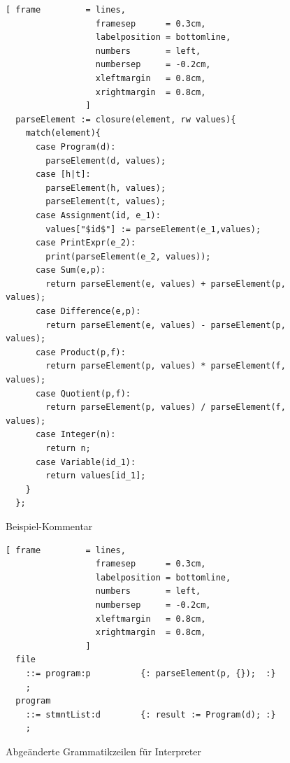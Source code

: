 \begin{figure}[!htb]

\begin{Verbatim}[ frame         = lines, 
                  framesep      = 0.3cm, 
                  labelposition = bottomline,
                  numbers       = left,
                  numbersep     = -0.2cm,
                  xleftmargin   = 0.8cm,
                  xrightmargin  = 0.8cm,
                ]
  parseElement := closure(element, rw values){
    match(element){
      case Program(d):
        parseElement(d, values);
      case [h|t]:
        parseElement(h, values);
        parseElement(t, values);
      case Assignment(id, e_1):
        values["$id$"] := parseElement(e_1,values);
      case PrintExpr(e_2):
        print(parseElement(e_2, values));
      case Sum(e,p):
        return parseElement(e, values) + parseElement(p, values);
      case Difference(e,p):
        return parseElement(e, values) - parseElement(p, values);
      case Product(p,f):
        return parseElement(p, values) * parseElement(f, values);
      case Quotient(p,f):
        return parseElement(p, values) / parseElement(f, values);
      case Integer(n):
        return n;
      case Variable(id_1):
        return values[id_1];
    }
  };
\end{Verbatim}
\caption{Beispiel-Kommentar}
\label{fig:example_interpreter_comment}
\end{figure}

\begin{figure}[!htb]

\begin{Verbatim}[ frame         = lines, 
                  framesep      = 0.3cm, 
                  labelposition = bottomline,
                  numbers       = left,
                  numbersep     = -0.2cm,
                  xleftmargin   = 0.8cm,
                  xrightmargin  = 0.8cm,
                ]
  file
    ::= program:p          {: parseElement(p, {});  :}
    ;
  program 
    ::= stmntList:d        {: result := Program(d); :}
    ;
\end{Verbatim}
\caption{Abgeänderte Grammatikzeilen für Interpreter}
\label{fig:interpreter_grammar_extra}
\end{figure}

